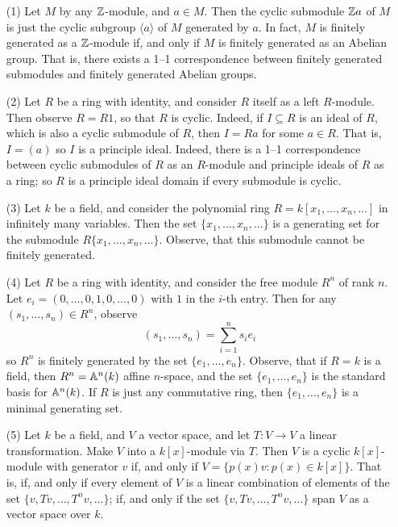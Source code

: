 \begin{example}\label{example_4.4}
  \begin{enumerate}
    \item[(1)] Let $M$ by any $\mathbb{Z}$-module, and  $a \in M$. Then the
      cyclic submodule $\mathbb{Z}{a}$ of $M$ is just the cyclic subgroup
      $\langle a \rangle$ of $M$ generated by  $a$. In fact, $M$ is
      finitely generated as a  $\mathbb{Z}$-module if, and only if  $M$ is
      finitely generated as an Abelian group. That is, there exists
      a 1--1 correspondence between finitely generated submodules and
      finitely generated Abelian groups.

    \item[(2)] Let $R$ be a ring with identity, and consider $R$
      itself as a left $R$-module. Then observe $R=R1$, so that $R$ is
      cyclic. Indeed, if  $I \subseteq R$ is an ideal of $R$, which is
      also a cyclic submodule of  $R$, then  $I=Ra$ for some  $a \in
      R$. That is, $I=(a)$ so $I$ is a principle ideal. Indeed, there
      is a 1--1 correspondence between cyclic submodules of $R$ as an
      $R$-module and principle ideals of $R$ as a ring; so $R$ is a
      principle ideal domain if every submodule is cyclic.

    \item[(3)] Let $k$ be a field, and consider the polynomial ring
      $R=k[x_1, \dots, x_n, \dots]$ in infinitely many variables. Then
      the set $\{x_1, \dots, x_n, \dots \}$ is a generating set for
      the submodule $R\{x_1, \dots, x_n, \dots\}$. Observe, that this
      submodule cannot be finitely generated.

    \item[(4)] Let $R$ be a ring with identity, and consider the free
     module $R^n$ of rank $n$. Let  $e_i=(0, \dots, 0,1,0, \dots, 0)$
     with $1$ in the $i$-th entry. Then for any $(s_1, \dots, s_n) \in
     R^n$, observe
     \begin{equation*}
       (s_1, \dots, s_n)=\sum_{i=1}^n{s_ie_i}
     \end{equation*}
     so $R^n$ is finitely generated by the set $\{e_1, \dots, e_n\}$.
     Observe, that if $R=k$ is a field, then $R^n=\mathbb{A}^n(k)$ affine
     $n$-space, and the set $\{e_1, \dots, e_n\}$ is the standard
     basis for $\mathbb{A}^n(k)$. If $R$ is just any commutative ring, then
     $\{e_1, \dots, e_n\}$ is a minimal generating set.

   \item[(5)] Let $k$ be a field, and  $V$ a vector space, and let
     $T:V \xrightarrow{} V$ a linear transformation. Make $V$ into a
     $k[x]$-module via $T$. Then  $V$ is a cyclic  $k[x]$-module with
     generator $v$ if, and only if  $V=\{p(x)v : p(x) \in k[x] \}$.
     That is, if, and only if every element of $V$ is a linear
     combination of elements of the set $\{v, Tv, \dots, T^nv, \dots
     \}$; if, and only if the set $\{v,Tv, \dots, T^nv, \dots \}$ span
     $V$ as a vector space over  $k$.


\end{enumerate}
\end{example}
